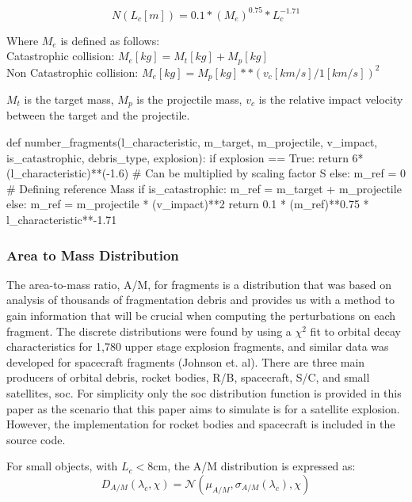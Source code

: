 \documentclass{article}
\newenvironment{code}{\captionsetup{type=listing}}{}
\begin{document}
$$N(L_c [m]) = 0.1 * (M_e)^{0.75} * L_c^{-1.71}$$

\noindent Where $M_e$ is defined as follows: \\
\indent Catastrophic collision: $M_e[kg] = M_t [kg] + M_p[kg]$ \\
\indent Non Catastrophic collision: $M_e[kg] = M_p[kg] **(v_c [km/s] / 1 [km/s])^2$

\noindent $M_t$ is the target mass, $M_p$ is the projectile mass, $v_c$ is the relative impact velocity between the target and the projectile.


 \begin{code}
	\begin{tcbpythoncode}
		def number_fragments(l_characteristic, m_target, m_projectile, v_impact, is_catastrophic, debris_type, explosion):
		if explosion == True: 
		return 6*(l_characteristic)**(-1.6) # Can be multiplied by scaling factor S
		else:
		m_ref = 0 	# Defining reference Mass
		if is_catastrophic: m_ref = m_target + m_projectile
		else: m_ref = m_projectile * (v_impact)**2
		return 0.1 * (m_ref)**0.75 * l_characteristic**-1.71
	\end{tcbpythoncode}
\end{code}

\newpage
\subsubsection{Area to Mass Distribution }

The area-to-mass ratio, A/M, for fragments is a distribution that was based on analysis of thousands of fragmentation debris and provides us with a method to gain information that will be crucial when computing the perturbations on each fragment. The discrete distributions were found by using a $\chi^2$ fit to orbital decay characteristics for 1,780 upper stage explosion fragments, and similar data was developed for spacecraft fragments (Johnson et. al). There are three main producers of orbital debris, rocket bodies, R/B, spacecraft, S/C, and small satellites, soc. For simplicity only the soc distribution function is provided in this paper as the scenario that this paper aims to simulate is for a satellite explosion. However, the implementation for rocket bodies and spacecraft is included in the source code.

For small objects, with $L_c < 8$cm, the A/M distribution is expressed as:  $$D_{A/M}(\lambda_c, \chi) = \mathcal{N}(\mu_{A/M}, \sigma_{A/M}(\lambda_c), \chi) $$
\end{document}
